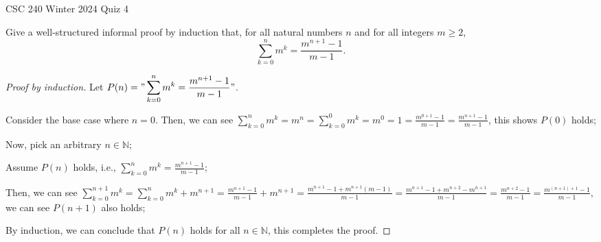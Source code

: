 \documentclass[11pt]{article}
\newcommand{\nats}{\mathbb{N}}
\begin{document}
\begin{center}
{\Large CSC 240 Winter 2024 Quiz 4}
\end{center}

Give a well-structured informal proof by induction that,
for all natural numbers $n$ and for all integers $m \geq 2$,
$$
\sum_{k=0}^n m^k = \frac{m^{n+1}-1}{m-1}.
$$


\begin{proof}[Proof by induction]\hfill

    Let $P(n)="\displaystyle\sum_{k=0}^n m^k=\frac{m^{n+1}-1}{m-1}"$.

    Consider the base case where $n=0$. Then, we can see $\displaystyle\sum_{k=0}^n m^k=m^n=\sum_{k=0}^0 m^k=m^0=1=\frac{m^{0+1}-1}{m-1}=\frac{m^{n+1}-1}{m-1}$, this shows $P(0)$ holds;

    \begin{adjustwidth}{0.5cm}{}
        Now, pick an arbitrary $n\in\nats$;

        \begin{adjustwidth}{1cm}{}
            Assume $P(n)$ holds, i.e., $\displaystyle\sum_{k=0}^n m^k=\frac{m^{n+1}-1}{m-1}$;

            Then, we can see $\displaystyle\sum_{k=0}^{n+1} m^k=\displaystyle\sum_{k=0}^n m^k+m^{n+1}=\frac{m^{n+1}-1}{m-1}+m^{n+1}=\frac{m^{n+1}-1+m^{n+1}(m-1)}{m-1}=\frac{m^{n+1}-1+m^{n+2}-m^{n+1}}{m-1}=\frac{m^{n+2}-1}{m-1}=\frac{m^{(n+1)+1}-1}{m-1}$, we can see $P(n+1)$ also holds;
        \end{adjustwidth}
    \end{adjustwidth}

    By induction, we can conclude that $P(n)$ holds for all $n\in\nats$, this completes the proof.
\end{proof}
\end{document}
